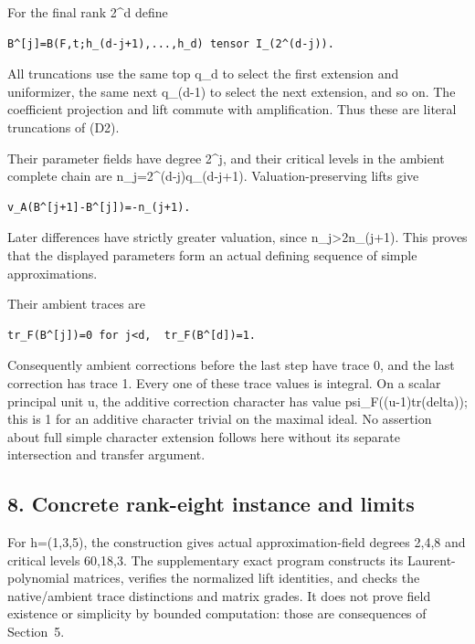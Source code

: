 For the final rank 2\^{}d define

\begin{Verbatim}[fontsize=\small,breaklines=true,breakanywhere=true]
B^[j]=B(F,t;h_(d-j+1),...,h_d) tensor I_(2^(d-j)).
\end{Verbatim}

All truncations use the same top q\_d to select the first extension and
uniformizer, the same next q\_(d-1) to select the next extension, and so
on. The coefficient projection and lift commute with amplification. Thus
these are literal truncations of (D2).

Their parameter fields have degree 2\^{}j, and their critical levels in
the ambient complete chain are n\_j=2\^{}(d-j)q\_(d-j+1).
Valuation-preserving lifts give

\begin{Verbatim}[fontsize=\small,breaklines=true,breakanywhere=true]
v_A(B^[j+1]-B^[j])=-n_(j+1).
\end{Verbatim}

Later differences have strictly greater valuation, since
n\_j\textgreater2n\_(j+1). This proves that the displayed parameters
form an actual defining sequence of simple approximations.

Their ambient traces are

\begin{Verbatim}[fontsize=\small,breaklines=true,breakanywhere=true]
tr_F(B^[j])=0 for j<d,  tr_F(B^[d])=1.
\end{Verbatim}

Consequently ambient corrections before the last step have trace 0, and
the last correction has trace 1. Every one of these trace values is
integral. On a scalar principal unit u, the additive correction
character has value psi\_F((u-1)tr(delta)); this is 1 for an additive
character trivial on the maximal ideal. No assertion about full simple
character extension follows here without its separate intersection and
transfer argument.

\hypertarget{dyadic_tower-concrete-rank-eight-instance-and-limits}{%
\subsection{8. Concrete rank-eight instance and
limits}\label{dyadic_tower-concrete-rank-eight-instance-and-limits}}

For h=(1,3,5), the construction gives actual approximation-field degrees
2,4,8 and critical levels 60,18,3. The supplementary exact program
constructs its Laurent-polynomial matrices, verifies the normalized lift
identities, and checks the native/ambient trace distinctions and matrix
grades. It does not prove field existence or simplicity by bounded
computation: those are consequences of Section~5.

